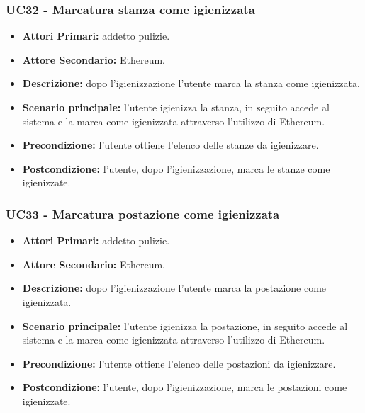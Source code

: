 \subsubsection{UC32 - Marcatura stanza come igienizzata}
\begin{itemize}
           	\item\textbf{Attori Primari:} addetto pulizie.
		\item\textbf{Attore Secondario:} Ethereum.
           	\item\textbf{Descrizione:} dopo l'igienizzazione l'utente marca la stanza come igienizzata.
           	\item\textbf{Scenario principale:} l'utente igienizza la stanza, in seguito accede al sistema e la marca come igienizzata attraverso l'utilizzo di Ethereum.
           	\item\textbf{Precondizione:} l'utente ottiene l'elenco delle stanze da igienizzare.
           	\item\textbf{Postcondizione:} l'utente, dopo l'igienizzazione, marca le stanze come igienizzate.
\end{itemize}
\subsubsection{UC33 - Marcatura postazione come igienizzata}
\begin{itemize}
           	\item\textbf{Attori Primari:} addetto pulizie.
		\item\textbf{Attore Secondario:} Ethereum.
           	\item\textbf{Descrizione:} dopo l'igienizzazione l'utente marca la postazione come igienizzata.
           	\item\textbf{Scenario principale:} l'utente igienizza la postazione, in seguito accede al sistema e la marca come igienizzata attraverso l'utilizzo di Ethereum.
           	\item\textbf{Precondizione:} l'utente ottiene l'elenco delle postazioni da igienizzare.
           	\item\textbf{Postcondizione:} l'utente, dopo l'igienizzazione, marca le postazioni come igienizzate.
\end{itemize}
